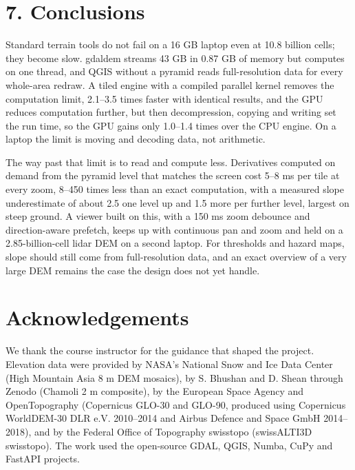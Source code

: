 \documentclass[10pt,a4paper]{article}
\begin{document}
\section*{7. Conclusions}
Standard terrain tools do not fail on a 16 GB laptop even at 10.8 billion cells; they become slow. gdaldem streams 43 GB in 0.87 GB of memory but computes on one thread, and QGIS without a pyramid reads full-resolution data for every whole-area redraw. A tiled engine with a compiled parallel kernel removes the computation limit, 2.1--3.5 times faster with identical results, and the GPU reduces computation further, but then decompression, copying and writing set the run time, so the GPU gains only 1.0--1.4 times over the CPU engine. On a laptop the limit is moving and decoding data, not arithmetic.

The way past that limit is to read and compute less. Derivatives computed on demand from the pyramid level that matches the screen cost 5--8 ms per tile at every zoom, 8--450 times less than an exact computation, with a measured slope underestimate of about 2.5\textdegree{} one level up and 1.5\textdegree{} more per further level, largest on steep ground. A viewer built on this, with a 150 ms zoom debounce and direction-aware prefetch, keeps up with continuous pan and zoom and held on a 2.85-billion-cell lidar DEM on a second laptop. For thresholds and hazard maps, slope should still come from full-resolution data, and an exact overview of a very large DEM remains the case the design does not yet handle.

\section*{\centering Acknowledgements}
We thank the course instructor for the guidance that shaped the project. Elevation data were provided by NASA's National Snow and Ice Data Center (High Mountain Asia 8 m DEM mosaics), by S. Bhushan and D. Shean through Zenodo (Chamoli 2 m composite), by the European Space Agency and OpenTopography (Copernicus GLO-30 and GLO-90, produced using Copernicus WorldDEM-30 \textcopyright{} DLR e.V. 2010--2014 and \textcopyright{} Airbus Defence and Space GmbH 2014--2018), and by the Federal Office of Topography swisstopo (swissALTI3D \textcopyright{} swisstopo). The work used the open-source GDAL, QGIS, Numba, CuPy and FastAPI projects.
\end{document}
